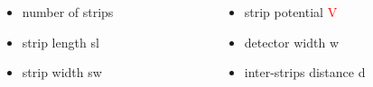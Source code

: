 \documentclass[14pt]{beamer}
\begin{document}
\begin{frame}
\begin{columns}
  \begin{column}{0.5\textwidth}

    \begin{itemize}
      \item number of strips
      \item strip length \textcolor{black!40!green}{sl}
      \item strip width \textcolor{black!40!green}{sw}
    \end{itemize}

  \end{column}

  \begin{column}{0.6\textwidth}
    \begin{itemize}
      \item strip potential \textcolor{red}{V}
      \item detector width \textcolor{black!40!green}{w}
      \item inter-strips distance \textcolor{black!40!green}{d}
    \end{itemize}

  \end{column}
\end{columns}

\end{frame}
\end{document}
